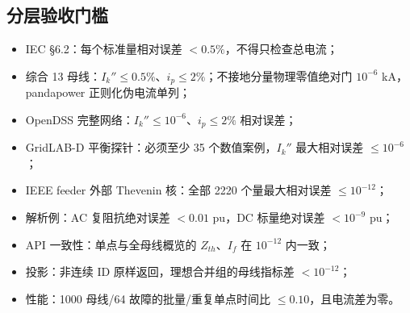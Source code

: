 \subsection{分层验收门槛}

\begin{itemize}
  \item IEC §6.2：每个标准量相对误差 $<0.5\%$，不得只检查总电流；
  \item 综合 13 母线：$I_k''\le0.5\%$、$i_p\le2\%$；不接地分量物理零值绝对门
        $10^{-6}$ kA，pandapower 正则化伪电流单列；
  \item OpenDSS 完整网络：$I_k''\le10^{-6}$、$i_p\le2\%$ 相对误差；
  \item GridLAB-D 平衡探针：必须至少 35 个数值案例，$I_k''$ 最大相对误差 $\le10^{-6}$；
  \item IEEE feeder 外部 Thevenin 核：全部 2220 个量最大相对误差 $\le10^{-12}$；
  \item 解析例：AC 复阻抗绝对误差 $<0.01$ pu，DC 标量绝对误差 $<10^{-9}$ pu；
  \item API 一致性：单点与全母线概览的 $Z_{th}$、$I_f$ 在 $10^{-12}$ 内一致；
  \item 投影：非连续 ID 原样返回，理想合并组的母线指标差 $<10^{-12}$；
  \item 性能：1000 母线/64 故障的批量/重复单点时间比 $\le0.10$，且电流差为零。
\end{itemize}
